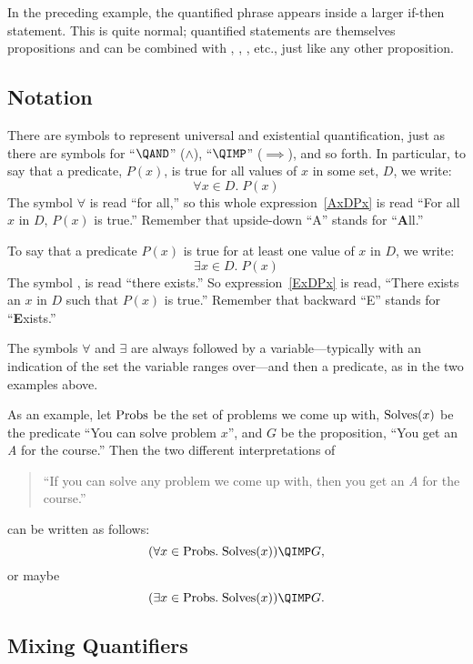 In the preceding example, the quantified phrase appears inside a
larger if-then statement.  This is quite normal; quantified statements
are themselves propositions and can be combined with \QAND, \QOR,
\QIMPLIES, etc., just like any other proposition.

\subsection{Notation}

There are symbols to represent universal and existential
quantification, just as there are symbols for ``$\QAND$'' ($\wedge$),
``$\QIMP$'' ($\implies$), and so forth.  In particular, to say
that a predicate, $P(x)$, is true for all values of $x$ in some set,
$D$, we write:
\begin{equation}\label{AxDPx}
\forall x \in D.\; P(x)
\end{equation}
The  symbol $\forall$ is read ``for all,''
so this whole expression~\eqref{AxDPx} is read ``For all $x$ in $D$,
$P(x)$ is true.''  Remember that upside-down ``A'' stands for
``\textbf{A}ll.''

To say that a predicate $P(x)$ is true for at least one value of $x$
in $D$, we write:
\begin{equation}\label{ExDPx}
\exists x \in D.\; P(x)
\end{equation}
The  symbol \term{$\exists$}, is read
``there exists.''  So expression~\eqref{ExDPx} is read, ``There exists
an $x$ in $D$ such that $P(x)$ is true.''  Remember that backward
``E'' stands for ``\textbf{E}xists.''

The symbols $\forall$ and $\exists$ are always followed by a
variable---typically with an indication of the set the variable ranges
over---and then a predicate, as in the two examples above.

As an example, let $\text{Probs}$ be the set of problems we come up with,
$\text{Solves}(x)$ be the predicate ``You can solve problem $x$'', and $G$ be
the proposition, ``You get an \emph{A} for the course.''  Then the two
different interpretations of
%
\begin{quote}
  ``If you can solve any problem we come up with, then you get an \emph{A}
  for the course.''
\end{quote}
can be written as follows:
\[
(\forall x \in \probs.\; \solves(x)) \QIMP G,
\]
or maybe
\[
(\exists x \in \probs.\; \solves(x)) \QIMP G.
\]

\subsection{Mixing Quantifiers}

